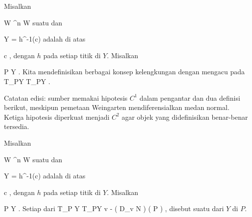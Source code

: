 \setcounter{section}{5}


Misalkan

\mavergleichskette
{\vergleichskette
{ W
}
{ \subseteq }{ \R^n
}
{  }{
}
{    }{
}
{   }{
}
}
{}{}{}
 { W } { \R
} {}
suatu
dan

\mavergleichskette
{\vergleichskette
{ Y
}
{ = }{ h^{-1}(c)
}
{  }{
}
{    }{
}
{   }{
}
}
{}{}{}
adalah
di atas

\mavergleichskette
{\vergleichskette
{ c
}
{ \in }{ \R
}
{  }{
}
{    }{
}
{   }{
}
}
{}{}{,}
dengan $h$
pada setiap titik di $Y$. Misalkan

\mavergleichskette
{\vergleichskette
{ P
}
{ \in }{ Y
}
{  }{
}
{    }{
}
{   }{
}
}
{}{}{.}
Kita mendefinisikan berbagai konsep kelengkungan dengan mengacu pada
 {T_PY} { T_PY
} {.}

Catatan edisi: sumber memakai hipotesis $C^1$ dalam pengantar dan dua definisi berikut, meskipun pemetaan Weingarten mendiferensialkan medan normal. Ketiga hipotesis diperkuat menjadi $C^2$ agar objek yang didefinisikan benar-benar tersedia.

{}
{

Misalkan

\mavergleichskette
{\vergleichskette
{ W
}
{ \subseteq }{ \R^n
}
{  }{
}
{    }{
}
{   }{
}
}
{}{}{}
 { W } { \R
} {}
suatu
dan

\mavergleichskette
{\vergleichskette
{ Y
}
{ = }{ h^{-1}(c)
}
{  }{
}
{    }{
}
{   }{
}
}
{}{}{}
adalah
di atas

\mavergleichskette
{\vergleichskette
{ c
}
{ \in }{ \R
}
{  }{
}
{    }{
}
{   }{
}
}
{}{}{,}
dengan $h$
pada setiap titik di $Y$. Misalkan

\mavergleichskette
{\vergleichskette
{ P
}
{ \in }{ Y
}
{  }{
}
{    }{
}
{   }{
}
}
{}{}{.}
Setiap
dari
 {T_P Y} { T_PY
} { v } { - \left(  D_{v}  N   \right) \left(   P  \right)
} {,}
disebut suatu
dari $Y$ di $P$.

}

